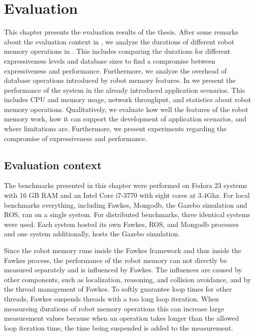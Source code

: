\chapter{Evaluation}
\label{sec:evaluation}
This chapter presents the evaluation results of the thesis. After some
remarks about the evaluation context in , we
analyze the durations of different robot memory operations in
. This includes comparing the durations for
different expressiveness levels and database sizes to find a
compromise between expressiveness and performance. Furthermore, we
analyze the overhead of database operations introduced by robot memory
features. In  we present the performance of
the system in the already introduced application scenarios. This
includes CPU and memory usage, network throughput, and statistics
about robot memory operations. Qualitatively, we evaluate how well the
features of the robot memory work, how it can support the development
of application scenarios, and where limitations are. Furthermore, we
present experiments regarding the compromise of expressiveness and
performance. 

\section{Evaluation context}
\label{sec:eval-context}
The benchmarks presented in this chapter were performed on Fedora 23
systems with 16 GB RAM and an Intel Core i7-3770 with eight cores at
$3.4$Ghz. For local benchmarks everything, including Fawkes, Mongodb,
the Gazebo simulation and ROS, ran on a single system. For distributed
benchmarks, three identical systems were used. Each system hosted its
own Fawkes, ROS, and Mongodb processes and one system additionally,
hosts the Gazebo simulation.

Since the robot memory runs inside the Fawkes framework and thus
inside the Fawkes process, the performance of the robot memory can not
directly be measured separately and is influenced by Fawkes. The
influences are caused by other components, such as localization,
reasoning, and collision avoidance, and by the thread management of
Fawkes. To softly guarantee loop times for other threads, Fawkes
suspends threads with a too long loop iteration. When measureing
durations of robot memory operations this can increase large
measurement values because when an operation takes longer than the
allowed loop iteration time, the time being suspended is added to the
measurement.

